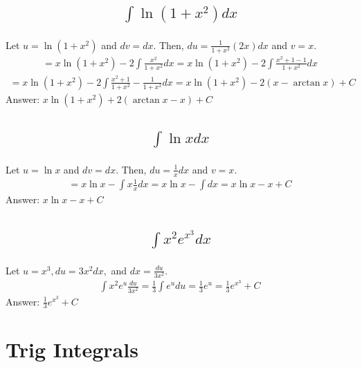 \documentclass{article}
\begin{document}
\subsection{
	\begin{align*}
		\int{\ln{(1 + x^2)} dx}
	\end{align*}
}
Let $u = \ln{(1 + x^2)}$ and $dv = dx$. Then, $du = \frac{1}{1 + x^2} (2x)dx$ and $v = x$.
\begin{align*}
	= x\ln{(1 + x^2)} - 2\int{\frac{x^2}{1 + x^2} dx} = x\ln{(1 + x^2)} - 2 \int{\frac{x^2 + 1 - 1}{1 + x^2} dx}
\end{align*}
\begin{align*}
	= x\ln{(1 + x^2)} - 2 \int{\frac{x^2 + 1}{1 + x^2} - \frac{1}{1 + x^2} dx} = x\ln{(1 + x^2)} - 2(x - \arctan{x}) + C
\end{align*}
Answer: $x \ln{(1 + x^2)} + 2(\arctan{x} - x) +C$

\subsection{
	\begin{align*}
		\int{\ln{x} dx}
	\end{align*}
}
Let $u = \ln{x}$ and $dv = dx$. Then, $du = \frac{1}{x}dx$ and $v = x$. 
\begin{align*}
	= x \ln{x} - \int{x \frac{1}{x}dx} = x\ln{x} - \int{dx} = x\ln{x} - x + C
\end{align*}
Answer: $x \ln{x} - x + C$

\subsection{
	\begin{align*}
		\int{x^2 e^{x^3} dx}
	\end{align*}
}
Let $u = x^3, du = 3x^2 dx,$ and $dx = \frac{du}{3x^2}$. 
\begin{align*}
	\int{x^2 e^u \frac{du}{3x^2}} = \frac{1}{3} \int{e^u du} = \frac{1}{3} e^u = \frac{1}{3} e^{x^3} + C
\end{align*}
Answer: $\frac{1}{3} e^{x^3} + C$

\section{Trig Integrals}
\end{document}
